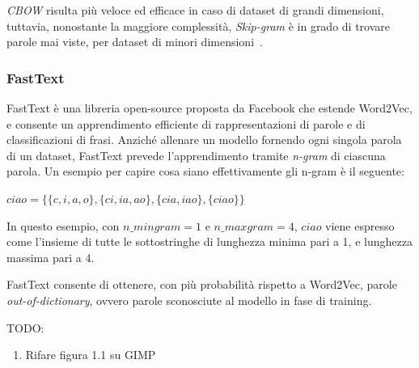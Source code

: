 \emph{CBOW} risulta più veloce ed efficace in caso di dataset di grandi dimensioni, tuttavia, nonostante la maggiore complessità, \emph{Skip-gram} è in grado di trovare parole mai viste, per dataset di minori dimensioni~\cite{mikolov2013efficient}.


\subsubsection{FastText}

FastText è una libreria open-source proposta da Facebook che estende Word2Vec, e consente un apprendimento efficiente di rappresentazioni di parole e di classificazioni di frasi.
Anziché allenare un modello fornendo ogni singola parola di un dataset, FastText prevede l'apprendimento tramite \textit{n-gram} di ciascuna parola.
Un esempio per capire cosa siano effettivamente gli n-gram è il seguente:

\begin{center}
    $ciao = \{\{c, i, a, o\},\{ci, ia, ao\}, \{cia, iao\}, \{ciao\}\}$
\end{center}

In questo esempio, con $n\_mingram = 1$ e $n\_maxgram = 4$, $ciao$ viene espresso come l'insieme di tutte le sottostringhe di lunghezza minima pari a 1, e lunghezza massima pari a 4.


FastText consente di ottenere, con più probabilità rispetto a Word2Vec, parole \emph{out-of-dictionary}, ovvero parole sconosciute al modello in fase di training.

TODO:

\begin{enumerate}
    \item Rifare figura 1.1 su GIMP
\end{enumerate}
